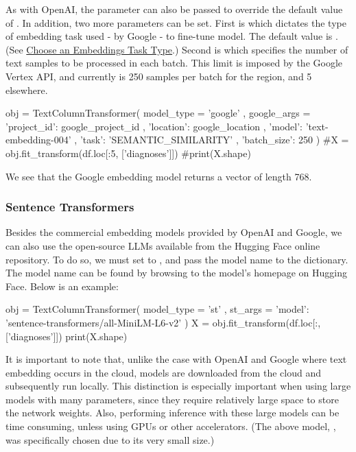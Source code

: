\documentclass[article]{jss}
\begin{document}
As with OpenAI, the  parameter can also be passed to override the default value of . In addition, two more parameters can be set. First is  which dictates the type of embedding task used - by Google - to fine-tune model. The default value is . (See \href{https://cloud.google.com/vertex-ai/generative-ai/docs/embeddings/task-types}{Choose an Embeddings Task Type}.) Second is  which specifies the number of text samples to be processed in each batch. This limit is imposed by the Google Vertex API, and currently is 250 samples per batch for the  region, and 5 elsewhere.


\begin{pyblock}
obj = TextColumnTransformer(
    model_type = 'google'
    , google_args = {
        'project_id': google_project_id
        , 'location': google_location
        , 'model': 'text-embedding-004'
        , 'task': 'SEMANTIC_SIMILARITY'
        , 'batch_size': 250
    }
)
#X = obj.fit_transform(df.loc[:5, ['diagnoses']])
#print(X.shape)
\end{pyblock}

We see that the Google embedding model returns a vector of length 768.

\subsubsection{Sentence Transformers}\label{subsubsec:using-embed-st}

Besides the commercial embedding models provided by OpenAI and Google, we can also use the open-source LLMs available from the Hugging Face online repository. To do so, we must set  to , and pass the model name to the  dictionary. The model name can be found by browsing to the model's homepage on Hugging Face. Below is an example:
\begin{pyblock}
obj = TextColumnTransformer(
    model_type = 'st'
    , st_args = {
        'model': 'sentence-transformers/all-MiniLM-L6-v2'
    }
)
X = obj.fit_transform(df.loc[:, ['diagnoses']])
print(X.shape)
\end{pyblock}
\stdoutpythontex %

It is important to note that, unlike the case with OpenAI and Google where text embedding occurs in the cloud,  models are downloaded from the cloud and subsequently run locally. This distinction is especially important when using large models with many parameters, since they require relatively large space to store the network weights. Also, performing inference with these large models can be time consuming, unless using GPUs or other accelerators. (The above model, , was specifically chosen due to its very small size.)
\end{document}
